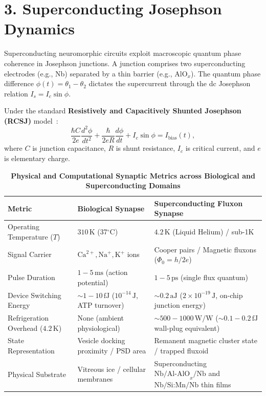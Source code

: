 \documentclass[10pt,twocolumn,letterpaper]{article}
\begin{document}
\section*{3. Superconducting Josephson Dynamics}

Superconducting neuromorphic circuits exploit macroscopic quantum phase coherence in Josephson junctions. A junction comprises two superconducting electrodes (e.g., Nb) separated by a thin barrier (e.g., $\text{AlO}_x$). The quantum phase difference $\phi(t) = \theta_1 - \theta_2$ dictates the supercurrent through the dc Josephson relation $I_s = I_c \sin\phi$. 

Under the standard \textbf{Resistively and Capacitively Shunted Josephson (RCSJ)} model~\cite{stewart1968current,mccumber1968effect}:
\begin{equation}
  \frac{\hbar C}{2e} \frac{d^2\phi}{dt^2} + \frac{\hbar}{2e R} \frac{d\phi}{dt} + I_c \sin\phi = I_{\text{bias}}(t),
  \label{eq:rcsj}
\end{equation}
where $C$ is junction capacitance, $R$ is shunt resistance, $I_c$ is critical current, and $e$ is elementary charge.

\begin{table}[t]
\centering
\small
\caption{\textbf{Physical and Computational Synaptic Metrics across Biological and Superconducting Domains}}
\vspace{0.06cm}
\begin{tabular}{@{}lll@{}}
\toprule
\textbf{Metric} & \textbf{Biological Synapse} & \textbf{Superconducting Fluxon Synapse} \\
\midrule
Operating Temperature ($T$) & $310\,\text{K}$ (37$^\circ$C) & $4.2\,\text{K}$ (Liquid Helium) / sub-1K \\
Signal Carrier & $\text{Ca}^{2+}, \text{Na}^+, \text{K}^+$ ions & Cooper pairs / Magnetic fluxons ($\Phi_0 = h/2e$) \\
Pulse Duration & $1 - 5\,\text{ms}$ (action potential) & $1 - 5\,\text{ps}$ (single flux quantum) \\
Device Switching Energy & $\sim 1 - 10\,\text{fJ}$ ($10^{-14}\,\text{J}$, ATP turnover) & $\sim 0.2\,\text{aJ}$ ($2 \times 10^{-19}\,\text{J}$, on-chip junction energy) \\
Refrigeration Overhead ($4.2\,\text{K}$) & None (ambient physiological) & $\sim 500 - 1000\,\text{W/W}$ ($\sim 0.1 - 0.2\,\text{fJ}$ wall-plug equivalent) \\
State Representation & Vesicle docking proximity / PSD area & Remanent magnetic cluster state / trapped fluxoid \\
Physical Substrate & Vitreous ice / cellular membranes & Superconducting $\text{Nb/Al-AlO}_x\text{/Nb}$ and $\text{Nb/Si:Mn/Nb}$ thin films \\
\bottomrule
\end{tabular}
\label{tab:metrics}
\end{table}
\end{document}
